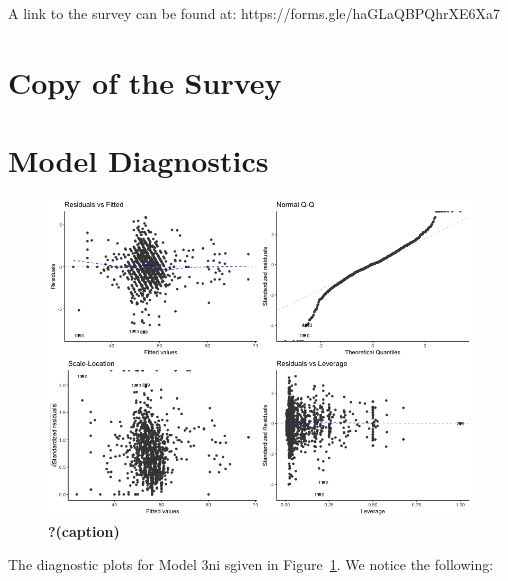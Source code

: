 \documentclass[
  letterpaper,
  DIV=11,
  numbers=noendperiod]{scrartcl}
\begin{document}
A link to the survey can be found at:
https://forms.gle/haGLaQBPQhrXE6Xa7

\hypertarget{copy-of-the-survey}{%
\section{Copy of the Survey}\label{copy-of-the-survey}}



\hypertarget{model-diagnostics}{%
\section{Model Diagnostics}\label{model-diagnostics}}

\begin{figure}

{\centering \includegraphics{../other/graphs/diagnostic_plot_model3.png}

}

\caption{\label{fig-dgplotone}\textbf{?(caption)}}

\end{figure}

The diagnostic plots for Model 3ni sgiven in Figure~\ref{fig-dgplotone}.
We notice the following:
\end{document}
